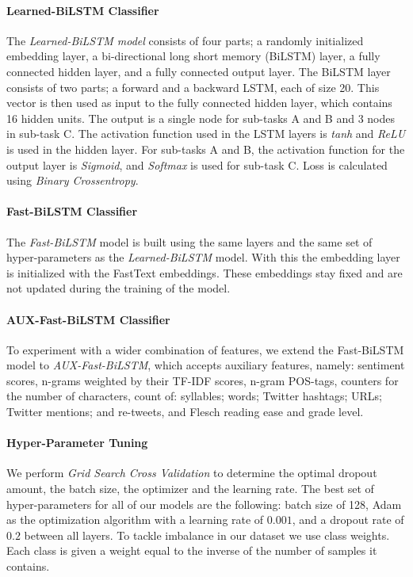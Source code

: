 \documentclass{article}
\begin{document}
\paragraph{Learned-BiLSTM Classifier}\label{learnedBiLSTMClassifier}
The \textit{Learned-BiLSTM model} consists of four parts; a randomly initialized embedding layer, a bi-directional long short memory (BiLSTM) layer, a fully connected hidden layer, and a fully connected output layer.  The BiLSTM layer consists of two parts; a forward and a backward LSTM, each of size 20. This vector is then used as input to the fully connected hidden layer, which contains 16 hidden units. The output is a single node for sub-tasks A and B and 3 nodes in sub-task C. The activation function used in the LSTM layers is \textit{tanh} and \textit{ReLU} is used in the hidden layer. For sub-tasks A and B, the activation function for the output layer is \textit{Sigmoid}, and \textit{Softmax} is used for sub-task C. Loss is calculated using \textit{Binary Crossentropy}.

\paragraph{Fast-BiLSTM Classifier}\label{fastBiLSTMClassifier}
The \textit{Fast-BiLSTM} model is built using the same layers and the same set of hyper-parameters as the \textit{Learned-BiLSTM} model. With this the embedding layer is initialized with the FastText embeddings. These embeddings stay fixed and are not updated during the training of the model. 

\paragraph{AUX-Fast-BiLSTM Classifier}\label{auxFastBilstmClassifier} To experiment with a wider combination of features, we extend the Fast-BiLSTM model to \textit{AUX-Fast-BiLSTM}, which accepts auxiliary features, namely: sentiment scores, n-grams weighted by their TF-IDF scores, n-gram POS-tags, counters for the number of characters, count of: syllables; words; Twitter hashtags; URLs; Twitter mentions; and re-tweets, and Flesch reading ease and grade level.


\paragraph{Hyper-Parameter Tuning}
We perform \textit{Grid Search Cross Validation}  to determine the optimal dropout amount, the batch size, the optimizer and the learning rate. The best set of hyper-parameters for all of our models are the following: batch size of 128, Adam \cite{kingma2014adam} as the optimization algorithm with a learning rate of $0.001$, and a dropout rate of $0.2$ between all layers. To tackle  imbalance in our dataset we use class weights. Each class is given a weight equal to the inverse of the number of samples it contains.
\end{document}
